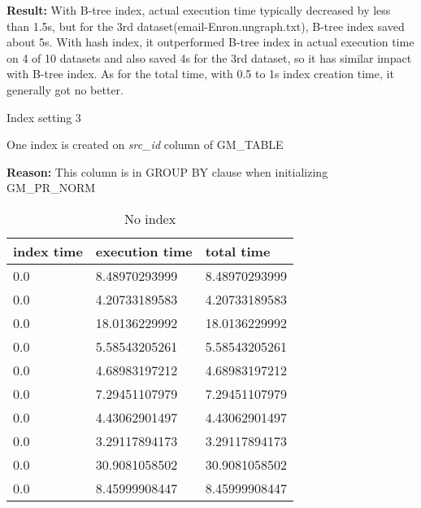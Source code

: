 \begin{itemize*}
\par \textbf{Result:} With B-tree index, actual execution time typically decreased by less than 1.5s, but for the 3rd dataset(email-Enron.ungraph.txt), B-tree index saved about 5s. With hash index, it outperformed B-tree index in actual execution time on 4 of 10 datasets and also saved 4s for the 3rd dataset, so it has similar impact with B-tree index. As for the total time, with 0.5 to 1s index creation time, it generally got no better.
\item{Index setting 3}
\par One index is created on \textit{src\_id} column of GM\_TABLE
\par \textbf{Reason:} This column is in GROUP BY clause when initializing GM\_PR\_NORM

\begin{table}[H]
\begin{center}
\begin{tabular}{|l|l|l|}
\hline
index time & execution time & total time     \\ \hline
0.0 & 8.48970293999 & 8.48970293999 \\ \hline
0.0 & 4.20733189583 & 4.20733189583 \\ \hline
0.0 & 18.0136229992 & 18.0136229992 \\ \hline
0.0 & 5.58543205261 & 5.58543205261 \\ \hline
0.0 & 4.68983197212 & 4.68983197212 \\ \hline
0.0 & 7.29451107979 & 7.29451107979 \\ \hline
0.0 & 4.43062901497 & 4.43062901497 \\ \hline
0.0 & 3.29117894173 & 3.29117894173 \\ \hline
0.0 & 30.9081058502 & 30.9081058502 \\ \hline
0.0 & 8.45999908447 & 8.45999908447 \\ \hline
\end{tabular}
\end{center}
\caption{No index}
\end{table}


\end{itemize*}
